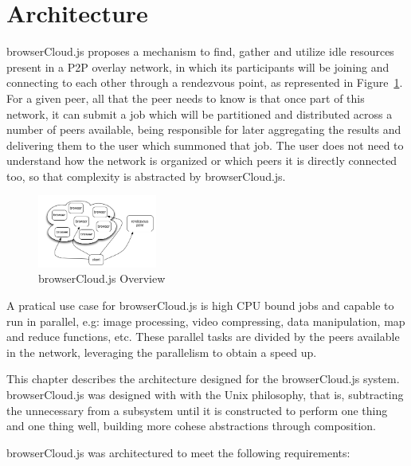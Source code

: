 
%
%

\section{Architecture}

browserCloud.js proposes a mechanism to find, gather and utilize idle resources present in a P2P overlay network, in which its participants will be joining and connecting to each other through a rendezvous point, as represented in Figure~\ref{fig:b-e}. For a given peer, all that the peer needs to know is that once part of this network, it can submit a job which will be partitioned and distributed across a number of peers available, being responsible for later aggregating the results and delivering them to the user which summoned that job. The user does not need to understand how the network is organized or which peers it is directly connected too, so that complexity is abstracted by browserCloud.js.

\begin{figure}[h!]
  \centering
  \includegraphics[width=0.35\textwidth]{figs/birds-eye}
  \caption{browserCloud.js Overview}
  \label{fig:b-e}
\end{figure}

A pratical use case for browserCloud.js is high CPU bound jobs and capable to run in parallel, e.g: image processing, video compressing, data manipulation, map and reduce functions, etc. These parallel tasks are divided by the peers available in the network, leveraging the parallelism to obtain a speed up.

This chapter describes the architecture designed for the browserCloud.js system. browserCloud.js was designed with with the Unix philosophy, that is, subtracting the unnecessary from a subsystem until it is constructed to perform one thing and one thing well, building more cohese abstractions through composition.

browserCloud.js was architectured to meet the following requirements:

